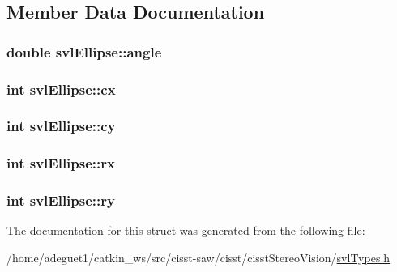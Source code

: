 \subsection{Member Data Documentation}
\hypertarget{structsvl_ellipse_a0d5c04831a5dbd378747bf24cf49b4a3}{
\subsubsection[{angle}]{\setlength{\rightskip}{0pt plus 5cm}double svl\-Ellipse\-::angle}}\label{structsvl_ellipse_a0d5c04831a5dbd378747bf24cf49b4a3}
\hypertarget{structsvl_ellipse_a2365044c025f5bb21a507fd68319b2fe}{
\subsubsection[{cx}]{\setlength{\rightskip}{0pt plus 5cm}int svl\-Ellipse\-::cx}}\label{structsvl_ellipse_a2365044c025f5bb21a507fd68319b2fe}
\hypertarget{structsvl_ellipse_a3e84c8bcbc5c6df40fbd4675afb94f4d}{
\subsubsection[{cy}]{\setlength{\rightskip}{0pt plus 5cm}int svl\-Ellipse\-::cy}}\label{structsvl_ellipse_a3e84c8bcbc5c6df40fbd4675afb94f4d}
\hypertarget{structsvl_ellipse_a7fe1303950ce19bb57c6894b372221b8}{
\subsubsection[{rx}]{\setlength{\rightskip}{0pt plus 5cm}int svl\-Ellipse\-::rx}}\label{structsvl_ellipse_a7fe1303950ce19bb57c6894b372221b8}
\hypertarget{structsvl_ellipse_a55d904daf9ca0fc87fada3a0607f5043}{
\subsubsection[{ry}]{\setlength{\rightskip}{0pt plus 5cm}int svl\-Ellipse\-::ry}}\label{structsvl_ellipse_a55d904daf9ca0fc87fada3a0607f5043}


The documentation for this struct was generated from the following file\-:\begin{DoxyCompactItemize}
\item 
/home/adeguet1/catkin\-\_\-ws/src/cisst-\/saw/cisst/cisst\-Stereo\-Vision/\hyperlink{svl_types_8h}{svl\-Types.\-h}\end{DoxyCompactItemize}
